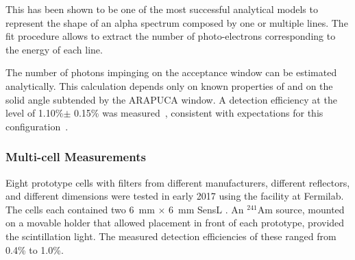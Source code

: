 

This has been shown to be  one of the most successful analytical models to represent the shape of an alpha spectrum composed by one or multiple lines. The fit procedure allows to extract the number of photo-electrons corresponding to the energy of each line.

The number of photons impinging on the acceptance window can be estimated analytically.  
This calculation depends only on known properties of \lar and on the solid angle subtended by the ARAPUCA window. A detection efficiency at the level of 1.10\%$\pm$ 0.15\% was measured~\cite{Segreto:2018jdx}, consistent with  expectations for this configuration~\cite{Marinho:2018doi}. %



\subsubsection{Multi-cell Measurements}
\label{ssec:valid-mcell}


Eight prototype  cells with filters from different manufacturers, different reflectors, and different dimensions were tested in early 2017 using the  facility at Fermilab.  
The  cells each contained two \SI{6}{mm} $\times$ \SI{6}{mm} SensL . 
An $^{241}$Am source, mounted on a movable holder that allowed placement in front of each prototype, provided the scintillation light. The measured detection efficiencies of these  ranged from 0.4\% to 1.0\%.

